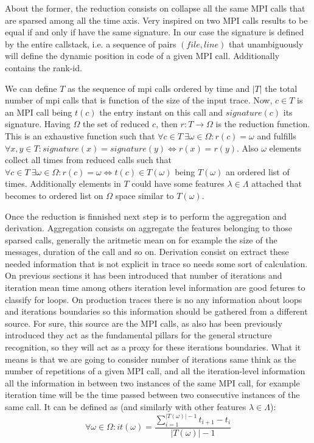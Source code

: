 About the former, the reduction consists on collapse all the same MPI calls that
are sparsed among all the time axis. Very inspired on \cite{noeth2009scalatrace} two MPI calls
results to be equal if and only if have the same signature. In our case the
signature is defined by the entire callstack, i.e. a sequence of pairs 
$(file, line)$ that unambiguously will define the dynamic position in code of a
given MPI call. Additionally contains the rank-id.

We can define $T$ as the sequence of mpi calls ordered by time and $|T|$ the 
total number of mpi calls that is function of the size of the input trace. 
Now, $c \in T$ is an MPI call being $t(c)$ the entry instant on this call and 
$signature(c)$ its signature. Having 
$\Omega$ the set of reduced $c$, then $r:T\rightarrow\Omega$ is the reduction 
function. This is an exhaustive function such that $\forall c \in T \medspace \exists 
\omega \in \Omega : r(c)=\omega$ and fulfills $\forall x,y \in T : 
signature(x)=signature(y) \Leftrightarrow r(x)=r(y)$. Also $\omega$ elements
collect all times from reduced calls such that $\forall c \in T \medspace
\exists \omega \in \Omega : r(c)=\omega \Leftrightarrow t(c) \in T(\omega)$
being $T(\omega)$ an ordered list of times. Additionally elements in $T$ could 
have some features $\lambda \in \Lambda$ attached that becomes to ordered list 
on $\Omega$ space similar to $T(\omega)$. 

Once the reduction is finnished next step is to perform the aggregation and
derivation. Aggregation consists on aggregate the features
belonging to those sparsed calls, generally the aritmetic mean on for example
the size of the messages, duration of the call and so on. Derivation 
consist on extract these needed information that is not
explicit in trace so needs some sort of calculation. On previous sections 
it has been introduced that number of iterations and
iteration mean time among others iteration level information are good fetures 
to classify for loops. On production traces there is no any information about
loops and iterations boundaries so this information should be gathered from a
different source. For sure, this source are the MPI calls, as also has been previously
introduced they act as the fundamental pillars for the general structure
recognition, so they will act as a proxy for these iterations boundaries. What
it means is that we are going to consider number of iterations same think as the
number of repetitions of a given MPI call, and all the iteration-level
information all the information in between two instances of the same MPI call,
for example iteration time will be the time passed between two consecutive
instances of the same call. It can be defined as (and similarly with other
features $\lambda \in \Lambda$): 
$$
\forall \omega \in \Omega : it(\omega)=\frac{\sum\limits_{i=1}^{|T(\omega)|-1} t_{i+1}-t_{i}}{|T(\omega)|-1}
$$


